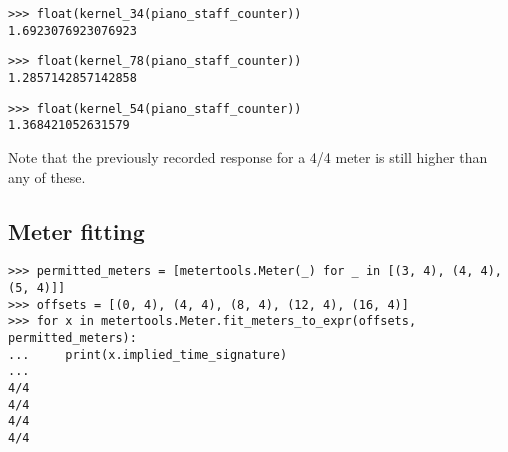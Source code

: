 \begin{singlespacing}
\vspace{-0.5\baselineskip}
\begin{lstlisting}
>>> float(kernel_34(piano_staff_counter))
1.6923076923076923
\end{lstlisting}
\begin{lstlisting}
>>> float(kernel_78(piano_staff_counter))
1.2857142857142858
\end{lstlisting}
\begin{lstlisting}
>>> float(kernel_54(piano_staff_counter))
1.368421052631579
\end{lstlisting}
\end{singlespacing}

\noindent Note that the previously recorded response for a 4/4 meter is still
higher than any of these.

\subsection{Meter fitting}

\begin{comment}
<abjad>
permitted_meters = [metertools.Meter(_) for _ in [(3, 4), (4, 4), (5, 4)]]
offsets = [(0, 4), (4, 4), (8, 4), (12, 4), (16, 4)]
for x in metertools.Meter.fit_meters_to_expr(offsets, permitted_meters):
    print(x.implied_time_signature)

</abjad>
\end{comment}

\begin{singlespacing}
\vspace{-0.5\baselineskip}
\begin{lstlisting}
>>> permitted_meters = [metertools.Meter(_) for _ in [(3, 4), (4, 4), (5, 4)]]
>>> offsets = [(0, 4), (4, 4), (8, 4), (12, 4), (16, 4)]
>>> for x in metertools.Meter.fit_meters_to_expr(offsets, permitted_meters):
...     print(x.implied_time_signature)
...
4/4
4/4
4/4
4/4
\end{lstlisting}
\end{singlespacing}

\begin{comment}
<abjad>
offsets = [(0, 4), (3, 4), (5, 4), (10, 4), (15, 4), (20, 4)]
for x in metertools.Meter.fit_meters_to_expr(offsets, permitted_meters):
    print(x.implied_time_signature)

</abjad>
\end{comment}

